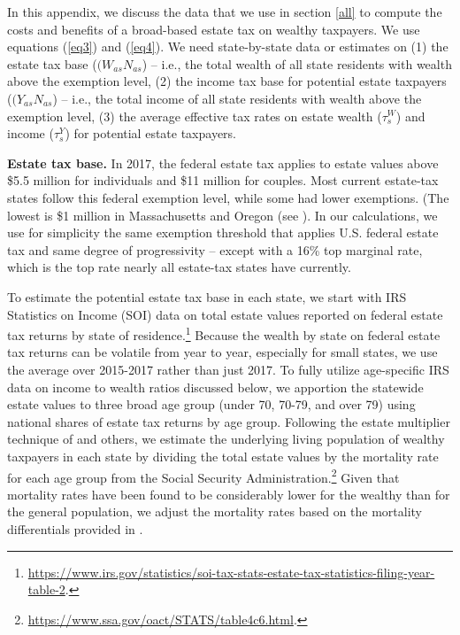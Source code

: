 \documentclass[12pt]{article}
\begin{document}
\vspace{20pt}

\vspace{10pt}

In this appendix, we discuss the data that we use in section \ref{all} to compute the costs and benefits of a broad-based estate tax on wealthy taxpayers.
We use equations (\ref{eq3}) and (\ref{eq4}).   
We need  state-by-state data or estimates on (1) the estate tax base ($(W_{as} N_{as}$) -- i.e., the total wealth of all state residents with wealth above the exemption level, (2) the income tax base for potential estate taxpayers ($(Y_{as} N_{as}$) -- i.e., the total income of all state residents with wealth above the exemption level, (3) the average effective tax rates on estate wealth ($\tau_s^{W}$) and income ($\tau_s^{Y}$) for potential estate taxpayers. 

\textbf{Estate tax base. }
In 2017, the federal estate tax applies to estate values above \$5.5 million for individuals and \$11 million for couples. Most current estate-tax states follow this federal exemption level, while some had lower exemptions. (The lowest is \$1 million in Massachusetts and Oregon (see \cite{michael2018survey}).
In our calculations, we use for simplicity the same exemption threshold  that applies U.S. federal estate tax 
and same degree of progressivity -- except with a 16\% top marginal rate, which is the top rate nearly all estate-tax states have currently. 

To estimate the potential estate tax base in each state, we start with IRS Statistics on Income (SOI) data on total estate values reported on federal estate tax returns by state of residence.\footnote{\url{https://www.irs.gov/statistics/soi-tax-stats-estate-tax-statistics-filing-year-table-2}.} Because the wealth by state on federal estate tax returns can be volatile from year to year, especially for small states, we use the average over 2015-2017 rather than just 2017. To fully utilize age-specific IRS data on income to wealth ratios discussed below, we apportion the statewide estate values to three broad age group (under 70, 70-79, and over 79) using national shares of estate tax returns by age group. Following the estate multiplier technique of \cite{kopczuk-saez:2004} and others, we estimate the underlying living population of wealthy taxpayers in each state by dividing the total estate values by the mortality rate for each age group from the Social Security Administration.\footnote{\url{https://www.ssa.gov/oact/STATS/table4c6.html}.} Given that mortality rates have been found to be considerably lower for the wealthy than for the general population, we adjust the mortality rates based on the mortality differentials provided in \cite{saez-zucman:2019}.   
\end{document}
